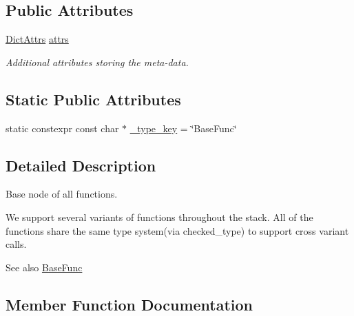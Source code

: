 \subsection*{Public Attributes}
\begin{DoxyCompactItemize}
\item 
\hyperlink{classtvm_1_1DictAttrs}{Dict\+Attrs} \hyperlink{classtvm_1_1BaseFuncNode_a4fd1a615179d1eb5748990e5de46d668}{attrs}
\begin{DoxyCompactList}\small\item\em Additional attributes storing the meta-\/data. \end{DoxyCompactList}\end{DoxyCompactItemize}
\subsection*{Static Public Attributes}
\begin{DoxyCompactItemize}
\item 
static constexpr const char $\ast$ \hyperlink{classtvm_1_1BaseFuncNode_af656e6ccc286ca59e8932f2a2b2f14c1}{\+\_\+type\+\_\+key} = \char`\"{}Base\+Func\char`\"{}
\end{DoxyCompactItemize}


\subsection{Detailed Description}
Base node of all functions. 

We support several variants of functions throughout the stack. All of the functions share the same type system(via checked\+\_\+type) to support cross variant calls.

\begin{DoxySeeAlso}{See also}
\hyperlink{classtvm_1_1BaseFunc}{Base\+Func} 
\end{DoxySeeAlso}


\subsection{Member Function Documentation}
